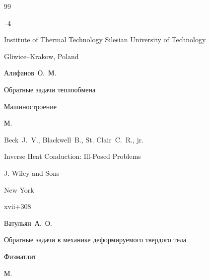 \begin{thebibliography}{99}

--4

\publ Institute of Thermal Technology Silesian University of Technology

\publaddr Gliwice--Krakow, Poland










\by Алифанов~О.~М.

\book Обратные задачи теплообмена


\publ Машиностроение

\publaddr М.













\by Beck~J.~V., Blackwell~B., St. Clair~C.~R., jr.

\book Inverse Heat Conduction: Ill-Posed Problems


\publ J. Wiley and Sons

\publaddr New York

\totalpages xvii+308






\by Ватульян~А.~О.

\book Обратные задачи в механике деформируемого твердого тела


\publ Физматлит

\publaddr М.






\end{thebibliography}
